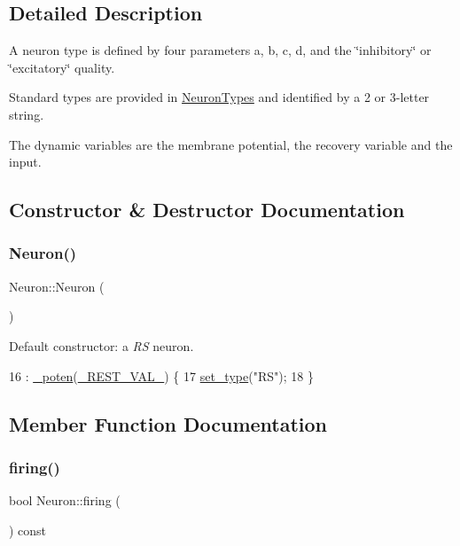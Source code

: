 \subsection{Detailed Description}
A neuron type is defined by four parameters {\ttfamily a}, {\ttfamily b}, {\ttfamily c}, {\ttfamily d}, and the \char`\"{}inhibitory\char`\"{} or \char`\"{}excitatory\char`\"{} quality.

Standard types are provided in \hyperlink{classNeuron_ab4b47274e756b72923d2f8a9a5037d23}{Neuron\+Types} and identified by a 2 or 3-\/letter string.

The dynamic variables are the membrane potential, the recovery variable and the input. 

\subsection{Constructor \& Destructor Documentation}
\mbox{\label{classNeuron_a823487d01615fadb8ac19a2768dd9d96}} 
\subsubsection{\texorpdfstring{Neuron()}{Neuron()}}
{\footnotesize\ttfamily Neuron\+::\+Neuron (\begin{DoxyParamCaption}{ }\end{DoxyParamCaption})}

Default constructor\+: a {\itshape RS} neuron. 
\begin{DoxyCode}
16                : \hyperlink{classNeuron_a7f7fdc3f9550b870351c60f618c11376}{\_poten}(\hyperlink{globals_8h_aeef69e4cb5a7aa8b2dc851c334613c2e}{\_REST\_VAL\_}) \{
17     \hyperlink{classNeuron_a533359bca915ef99c96e50d4bfff58b2}{set\_type}(\textcolor{stringliteral}{"RS"});
18 \}
\end{DoxyCode}


\subsection{Member Function Documentation}
\mbox{\label{classNeuron_a4f477ebb623a7681c0f09dbfc4608a0d}} 
\subsubsection{\texorpdfstring{firing()}{firing()}}
{\footnotesize\ttfamily bool Neuron\+::firing (\begin{DoxyParamCaption}{ }\end{DoxyParamCaption}) const\hspace{0.3cm}{\ttfamily [inline]}}

